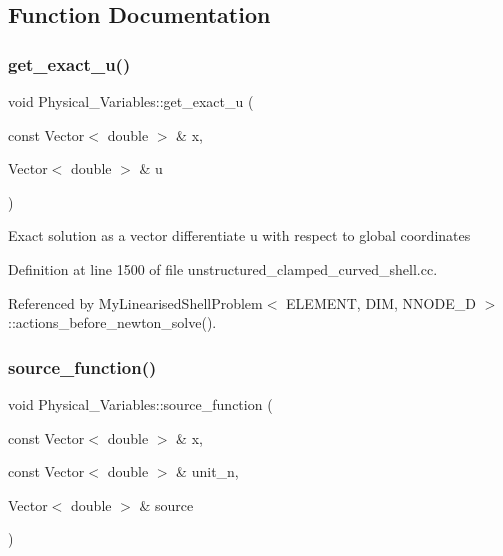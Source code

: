 \subsection{Function Documentation}
\mbox{\label{namespacePhysical__Variables_af90d0c580c57b1152fd1cc7046055031}} 
\subsubsection{\texorpdfstring{get\+\_\+exact\+\_\+u()}{get\_exact\_u()}}
{\footnotesize\ttfamily void Physical\+\_\+\+Variables\+::get\+\_\+exact\+\_\+u (\begin{DoxyParamCaption}\item[{const Vector$<$ double $>$ \&}]{x,  }\item[{Vector$<$ double $>$ \&}]{u }\end{DoxyParamCaption})}

Exact solution as a vector differentiate u with respect to global coordinates 

Definition at line 1500 of file unstructured\+\_\+clamped\+\_\+curved\+\_\+shell.\+cc.



Referenced by My\+Linearised\+Shell\+Problem$<$ E\+L\+E\+M\+E\+N\+T, D\+I\+M, N\+N\+O\+D\+E\+\_\+D $>$\+::actions\+\_\+before\+\_\+newton\+\_\+solve().

\mbox{\label{namespacePhysical__Variables_a36f0d0dc5f8aa4eafd7c4d6fe943c4e8}} 
\subsubsection{\texorpdfstring{source\+\_\+function()}{source\_function()}}
{\footnotesize\ttfamily void Physical\+\_\+\+Variables\+::source\+\_\+function (\begin{DoxyParamCaption}\item[{const Vector$<$ double $>$ \&}]{x,  }\item[{const Vector$<$ double $>$ \&}]{unit\+\_\+n,  }\item[{Vector$<$ double $>$ \&}]{source }\end{DoxyParamCaption})}



